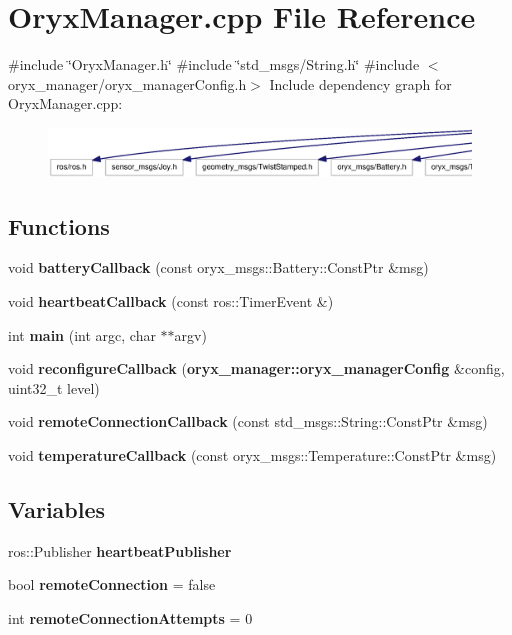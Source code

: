 \section{\-Oryx\-Manager.\-cpp \-File \-Reference}
\label{OryxManager_8cpp}
{\ttfamily \#include \char`\"{}\-Oryx\-Manager.\-h\char`\"{}}\*
{\ttfamily \#include \char`\"{}std\-\_\-msgs/\-String.\-h\char`\"{}}\*
{\ttfamily \#include $<$oryx\-\_\-manager/oryx\-\_\-manager\-Config.\-h$>$}\*
\-Include dependency graph for \-Oryx\-Manager.\-cpp\-:
\nopagebreak
\begin{figure}[H]
\begin{center}
\leavevmode
\includegraphics[width=350pt]{OryxManager_8cpp__incl}
\end{center}
\end{figure}
\subsection*{\-Functions}
\begin{DoxyCompactItemize}
\item 
void {\bf battery\-Callback} (const oryx\-\_\-msgs\-::\-Battery\-::\-Const\-Ptr \&msg)
\item 
void {\bf heartbeat\-Callback} (const ros\-::\-Timer\-Event \&)
\item 
int {\bf main} (int argc, char $\ast$$\ast$argv)
\item 
void {\bf reconfigure\-Callback} ({\bf oryx\-\_\-manager\-::oryx\-\_\-manager\-Config} \&config, uint32\-\_\-t level)
\item 
void {\bf remote\-Connection\-Callback} (const std\-\_\-msgs\-::\-String\-::\-Const\-Ptr \&msg)
\item 
void {\bf temperature\-Callback} (const oryx\-\_\-msgs\-::\-Temperature\-::\-Const\-Ptr \&msg)
\end{DoxyCompactItemize}
\subsection*{\-Variables}
\begin{DoxyCompactItemize}
\item 
ros\-::\-Publisher {\bf heartbeat\-Publisher}
\item 
bool {\bf remote\-Connection} = false
\item 
int {\bf remote\-Connection\-Attempts} = 0
\end{DoxyCompactItemize}


